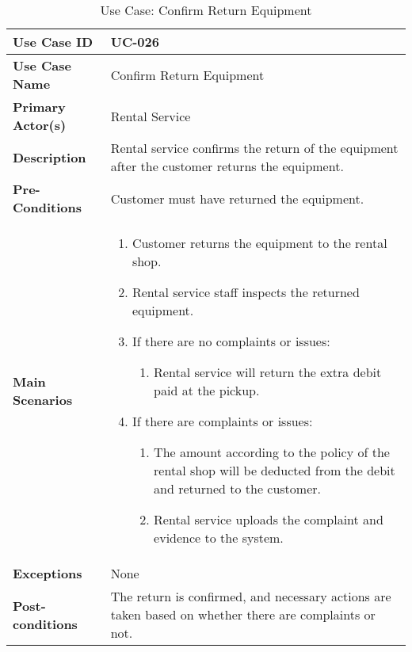 \begin{table}[ht]
    \centering
    \begin{tabular}{|l|p{}|}
        \hline
        \textbf{Use Case ID} & UC-026 \\
        \hline
        \textbf{Use Case Name} & Confirm Return Equipment \\
        \hline
        \textbf{Primary Actor(s)} & Rental Service \\
        \hline
        \textbf{Description} & Rental service confirms the return of the equipment after the customer returns the equipment. \\
        \hline
        \textbf{Pre-Conditions} & Customer must have returned the equipment. \\
        \hline
        \textbf{Main Scenarios} & 
        \begin{enumerate}[label=\arabic*.,itemsep=0pt]
            \item Customer returns the equipment to the rental shop.
            \item Rental service staff inspects the returned equipment.
            \item If there are no complaints or issues:
                \begin{enumerate}[label=\alph*.,itemsep=0pt]
                    \item Rental service will return the extra debit paid at the pickup.
                \end{enumerate}
            \item If there are complaints or issues:
                \begin{enumerate}[label=\alph*.,itemsep=0pt]
                    \item The amount according to the policy of the rental shop will be deducted from the debit and returned to the customer.
                    \item Rental service uploads the complaint and evidence to the system.
                \end{enumerate}
        \end{enumerate} \\
        \hline
        \textbf{Exceptions} & None \\
        \hline
        \textbf{Post-conditions} & The return is confirmed, and necessary actions are taken based on whether there are complaints or not. \\
        \hline
    \end{tabular}
    \label{tab:use-case-confirm-return-equipment}
    \caption{Use Case: Confirm Return Equipment}
\end{table}


